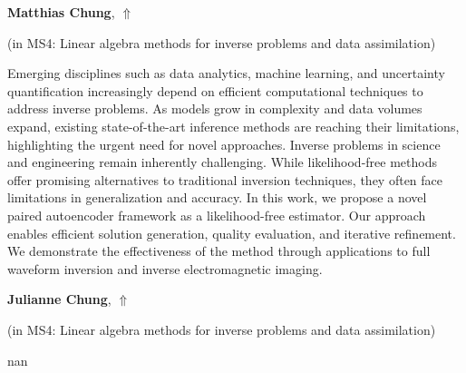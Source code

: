 \documentclass[ILAS2025-program.tex]{subfiles}
\begin{document}
\hypertarget{down0202}{}\begin{ilasabstract}
    
\textbf{Matthias Chung},  \hfill \hyperlink{up0202}{$\Uparrow$}
    
    
(in {\color{mstitle}MS4: Linear algebra methods for inverse problems and data assimilation})
        
\mtskip
    Emerging disciplines such as data analytics, machine learning, and uncertainty quantification increasingly depend on efficient computational techniques to address inverse problems. As models grow in complexity and data volumes expand, existing state-of-the-art inference methods are reaching their limitations, highlighting the urgent need for novel approaches.
Inverse problems in science and engineering remain inherently challenging. While likelihood-free methods offer promising alternatives to traditional inversion techniques, they often face limitations in generalization and accuracy. In this work, we propose a novel paired autoencoder framework as a likelihood-free estimator. Our approach enables efficient solution generation, quality evaluation, and iterative refinement. We demonstrate the effectiveness of the method through applications to full waveform inversion and inverse electromagnetic imaging.

\end{ilasabstract}
    

\hypertarget{down0312}{}\begin{ilasabstract}
    
\textbf{Julianne Chung},  \hfill \hyperlink{up0312}{$\Uparrow$}
    
    
(in {\color{mstitle}MS4: Linear algebra methods for inverse problems and data assimilation})
        
\mtskip
    nan
\end{ilasabstract}
    
\end{document}
